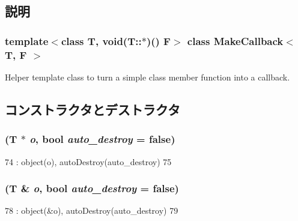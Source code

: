 \subsection{説明}
\subsubsection*{template$<$class T, void(T::$\ast$)() F$>$ class MakeCallback$<$ T, F $>$}

Helper template class to turn a simple class member function into a callback. 

\subsection{コンストラクタとデストラクタ}
\hypertarget{classMakeCallback_a89db75a301f5973c77e3ecf451421bca}{
\subsubsection[{MakeCallback}]{ (T $\ast$ {\em o}, \/  bool {\em auto\_\-destroy} = {\ttfamily false})}}
\label{classMakeCallback_a89db75a301f5973c77e3ecf451421bca}



\begin{DoxyCode}
74         : object(o), autoDestroy(auto_destroy)
75     { }
\end{DoxyCode}
\hypertarget{classMakeCallback_a246ba82996f3fc041c535e56adc8a980}{
\subsubsection[{MakeCallback}]{ (T \& {\em o}, \/  bool {\em auto\_\-destroy} = {\ttfamily false})}}
\label{classMakeCallback_a246ba82996f3fc041c535e56adc8a980}



\begin{DoxyCode}
78         : object(&o), autoDestroy(auto_destroy)
79     { }
\end{DoxyCode}


